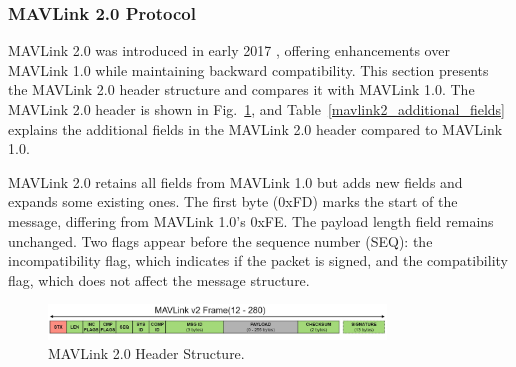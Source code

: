 \subsubsection{MAVLink 2.0 Protocol}

MAVLink 2.0 was introduced in early 2017 \cite{allouch2019mavsec, khan2020emerging}, offering enhancements over MAVLink 1.0 while maintaining backward compatibility. This section presents the MAVLink 2.0 header structure and compares it with MAVLink 1.0. The MAVLink 2.0 header is shown in Fig.~\ref{fig:mavlink-v2-packet}, and Table~\ref{mavlink2_additional_fields} explains the additional fields in the MAVLink 2.0 header compared to MAVLink 1.0.

\vspace{0.5cm}

MAVLink 2.0 retains all fields from MAVLink 1.0 but adds new fields and expands some existing ones. The first byte (0xFD) marks the start of the message, differing from MAVLink 1.0's 0xFE. The payload length field remains unchanged. Two flags appear before the sequence number (SEQ): the incompatibility flag, which indicates if the packet is signed, and the compatibility flag, which does not affect the message structure.

\begin{figure}[ht]
\centering
\includegraphics[width=0.8\textwidth]{Figures/Chapter1/Section4/2.jpg}
\caption{MAVLink 2.0 Header Structure.}
\label{fig:mavlink-v2-packet}
\end{figure}


